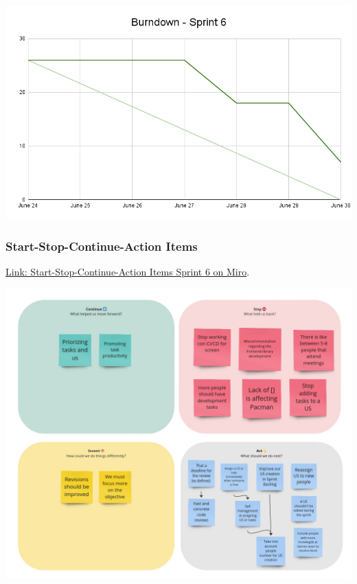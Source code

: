 \includegraphics[width=\textwidth]{./artifacts/src/sprint-6/assets/Burndown-Sprint6.png}

\hypertarget{startstopcontinueactionitems-s3}{
\subsubsection{Start-Stop-Continue-Action Items}\label{Start-Stop-Continue-Action Items S6}}
\href{https://miro.com/app/board/uXjVKDO7l8M=/?moveToWidget=3458764591631763576&cot=14}{Link: Start-Stop-Continue-Action Items Sprint 6 on Miro}.

\includegraphics[width=\textwidth]{./artifacts/src/sprint-6/assets/retrospective-s6.png}


